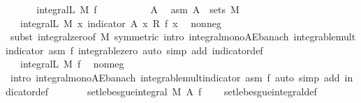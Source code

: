 \begin{isabellebody}
\ \isanewline
\ \ \isamarkupfalse%
\ {\isacharasterisk}{\kern0pt}{\isacharcolon}{\kern0pt}\ {\isachardoublequoteopen}integral\isactrlsup L\ M\ f\ {\isacharequal}{\kern0pt}\ {}{\isachardoublequoteclose}\isanewline
\ \ \isacommand{{\isacharbraceleft}{\kern0pt}}\isamarkupfalse%
\isanewline
\ \ \ \ \isamarkupfalse%
\ A\ \isamarkupfalse%
\ asm{\isacharcolon}{\kern0pt}\ {\isachardoublequoteopen}A\ {\isasymin}\ sets\ M{\isachardoublequoteclose}\isanewline
\ \ \ \ \isamarkupfalse%
\ {\isachardoublequoteopen}{}\ {\isasymle}\ integral\isactrlsup L\ M\ {\isacharparenleft}{\kern0pt}{\isasymlambda}x{\isachardot}{\kern0pt}\ indicator\ A\ x\ {\isacharasterisk}{\kern0pt}\isactrlsub R\ f\ x{\isacharparenright}{\kern0pt}{\isachardoublequoteclose}\ \isamarkupfalse%
\ nonneg\ \isamarkupfalse%
\ {\isacharparenleft}{\kern0pt}subst\ integral{\isacharunderscore}{\kern0pt}zero{\isacharbrackleft}{\kern0pt}of\ M{\isacharcomma}{\kern0pt}\ symmetric{\isacharbrackright}{\kern0pt}{\isacharcomma}{\kern0pt}\ intro\ integral{\isacharunderscore}{\kern0pt}mono{\isacharunderscore}{\kern0pt}AE{\isacharunderscore}{\kern0pt}banach\ integrable{\isacharunderscore}{\kern0pt}mult{\isacharunderscore}{\kern0pt}indicator\ asm\ f\ integrable{\isacharunderscore}{\kern0pt}zero{\isacharcomma}{\kern0pt}\ auto\ simp\ add{\isacharcolon}{\kern0pt}\ indicator{\isacharunderscore}{\kern0pt}def{\isacharparenright}{\kern0pt}\isanewline
\ \ \ \ \isamarkupfalse%
\ \isamarkupfalse%
\ {\isachardoublequoteopen}{\isachardot}{\kern0pt}{\isachardot}{\kern0pt}{\isachardot}{\kern0pt}\ {\isasymle}\ integral\isactrlsup L\ M\ f{\isachardoublequoteclose}\ \isamarkupfalse%
\ nonneg\ \isamarkupfalse%
\ {\isacharparenleft}{\kern0pt}intro\ integral{\isacharunderscore}{\kern0pt}mono{\isacharunderscore}{\kern0pt}AE{\isacharunderscore}{\kern0pt}banach\ integrable{\isacharunderscore}{\kern0pt}mult{\isacharunderscore}{\kern0pt}indicator\ asm\ f{\isacharcomma}{\kern0pt}\ auto\ simp\ add{\isacharcolon}{\kern0pt}\ indicator{\isacharunderscore}{\kern0pt}def{\isacharparenright}{\kern0pt}\isanewline
\ \ \ \ \isamarkupfalse%
\ \isamarkupfalse%
\ {\isachardoublequoteopen}set{\isacharunderscore}{\kern0pt}lebesgue{\isacharunderscore}{\kern0pt}integral\ M\ A\ f\ {\isacharequal}{\kern0pt}\ {}{\isachardoublequoteclose}\ \isamarkupfalse%
\ set{\isacharunderscore}{\kern0pt}lebesgue{\isacharunderscore}{\kern0pt}integral{\isacharunderscore}{\kern0pt}def\ \isamarkupfalse%

\end{isabellebody}
